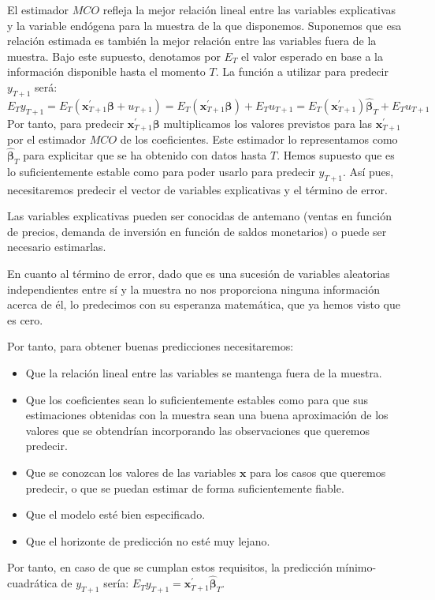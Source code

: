 El estimador $MCO$ refleja la mejor relaci\'on lineal entre las variables
explicativas y la variable end\'ogena para la muestra de la que disponemos.
Suponemos que esa relaci\'on estimada es tambi\'en la mejor relaci\'on entre
las variables fuera de la muestra. Bajo este supuesto, denotamos por
$E_{T}$ el valor esperado en base a la informaci\'on disponible hasta
el momento $T$. La funci\'on a utilizar para predecir $y_{T+1}$ ser\'a:
\begin{equation*}
E_{T}y_{T+1}=E_{T}\left(\boldsymbol{x}^{\prime}_{T+1}\boldsymbol{\beta}+u_{T+1}\right)=E_{T}\left(\boldsymbol{x}^{\prime}_{T+1}\boldsymbol{\beta}\right)+E_{T}u_{T+1}=E_{T}\left(\boldsymbol{x}^{\prime}_{T+1}\right)\hat{\boldsymbol{\beta}}_{T}+E_{T}u_{T+1}
\end{equation*}
Por tanto, para predecir $\boldsymbol{x}^{\prime}_{T+1}\boldsymbol{\beta}$
multiplicamos los valores previstos para las $\boldsymbol{x}^{\prime}_{T+1}$
por el estimador $MCO$ de los coeficientes. Este estimador lo representamos
como $\hat{\boldsymbol{\beta}}_{T}$ para explicitar que se ha obtenido
con datos hasta $T$. Hemos supuesto que es lo suficientemente estable
como para poder usarlo para predecir $y_{T+1}$. As\'i pues, necesitaremos
predecir el vector de variables explicativas y el t\'ermino de error.

Las variables explicativas pueden ser conocidas de antemano (ventas
en funci\'on de precios, demanda de inversi\'on en funci\'on de saldos monetarios)
o puede ser necesario estimarlas.

En cuanto al t\'ermino de error, dado que es una sucesi\'on de variables
aleatorias independientes entre s\'i y la muestra no nos proporciona
ninguna informaci\'on acerca de \'el, lo predecimos con su esperanza matem\'atica,
que ya hemos visto que es cero.

Por tanto, para obtener buenas predicciones necesitaremos:
\begin{itemize}
\item Que la relaci\'on lineal entre las variables se mantenga fuera de la
muestra.
\item Que los coeficientes sean lo suficientemente estables como para que
sus estimaciones obtenidas con la muestra sean una buena aproximaci\'on
de los valores que se obtendr\'ian incorporando las observaciones que
queremos predecir.
\item Que se conozcan los valores de las variables $\boldsymbol{x}$ para
los casos que queremos predecir, o que se puedan estimar de forma
suficientemente fiable.
\item Que el modelo est\'e bien especificado.
\item Que el horizonte de predicci\'on no est\'e muy lejano.
\end{itemize}
Por tanto, en caso de que se cumplan estos requisitos, la predicci\'on
m\'inimo-cuadr\'atica de $y_{T+1}$ ser\'ia: $E_{T}y_{T+1}=\boldsymbol{x}^{\prime}_{T+1}\hat{\boldsymbol{\beta}}_{T}$.

